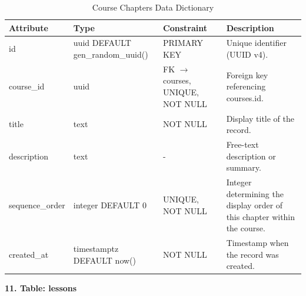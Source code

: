 \documentclass[12pt, oneside]{article} %
\newcommand{\tabbreak}{\hyphenpenalty=200\exhyphenpenalty=200\tolerance=4000\hbadness=10000\hspace{0pt}}
\begin{document}
\begin{table}[H]
\caption{Course Chapters Data Dictionary}
\label{tab:dd_course_chapters}
\vspace{-4mm}
\begin{center}
\renewcommand{\arraystretch}{1.15}
\scriptsize
\begin{tabular}{|>{\raggedright\arraybackslash\tabbreak}p{2.67cm}|>{\raggedright\arraybackslash\tabbreak}p{2.93cm}|>{\raggedright\arraybackslash\tabbreak}p{2.67cm}|>{\raggedright\arraybackslash\tabbreak}p{4.51cm}|}
\hline
\textbf{Attribute} & \textbf{Type} & \textbf{Constraint} & \textbf{Description} \\ \hline
id & uuid DEFAULT gen\_random\_uuid() & PRIMARY KEY & Unique identifier (UUID v4). \\ \hline
course\_id & uuid & FK $\rightarrow$ courses, UNIQUE, NOT NULL & Foreign key referencing courses.id. \\ \hline
title & text & NOT NULL & Display title of the record. \\ \hline
description & text & - & Free-text description or summary. \\ \hline
sequence\_order & integer DEFAULT 0 & UNIQUE, NOT NULL & Integer determining the display order of this chapter within the course. \\ \hline
created\_at & timestamptz DEFAULT now() & NOT NULL & Timestamp when the record was created. \\ \hline
\end{tabular}
\end{center}
\end{table}

\textbf{11. Table: lessons}
\end{document}
